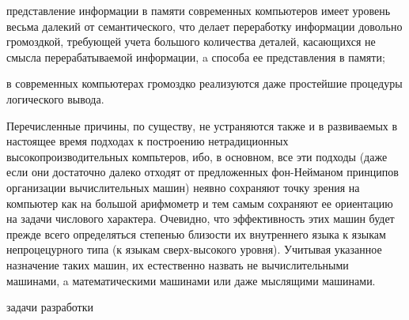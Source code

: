 \begin{scnsubstruct}
{\begin{scnitemize}
			\item представление информации в памяти современных компьютеров имеет уровень весьма далекий от семантического, что делает переработку информации довольно громоздкой, требующей учета большого количества деталей, касающихся не смысла перерабатываемой информации, a способа ее представления в памяти;
			\item в современных компьютерах громоздко реализуются даже простейшие процедуры логического вывода.
		\end{scnitemize}
		Перечисленные причины, по существу, не устраняются также и в развиваемых в настоящее время подходах к построению нетрадиционных высокопроизводительных компьтеров, ибо, в основном, все эти подходы (даже если они достаточно далеко отходят от предложенных фон-Нейманом принципов организации вычислительных машин) неявно сохраняют точку зрения на компьютер как на большой арифмометр и тем самым сохраняют ее ориентацию на задачи числового характера. Очевидно, что эффективность этих машин будет прежде всего определяться степенью близости их внутреннего языка к языкам непроцецурного типа (к языкам сверх-высокого уровня). Учитывая указанное назначение таких машин, их естественно назвать не вычислительными машинами, a математическими машинами или даже мыслящими машинами.}
	\begin{scnrelfromset}{задачи разработки}

\end{scnrelfromset}
\end{scnsubstruct}
